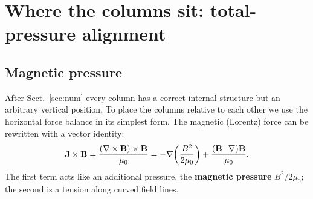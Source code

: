 \section{Where the columns sit: total-pressure alignment}\label{sec:align}
\subsection{Magnetic pressure}
After Sect.~\ref{sec:num} every column has a correct internal structure but an arbitrary vertical position. To place the
columns relative to each other we use the horizontal force balance in its simplest form. The magnetic (Lorentz) force can be
rewritten with a vector identity:
\begin{equation}
\mathbf J\times\mathbf B=\frac{(\nabla\times\mathbf B)\times\mathbf B}{\mu_0}
=-\nabla\!\left(\frac{B^2}{2\mu_0}\right)+\frac{(\mathbf B\cdot\nabla)\mathbf B}{\mu_0}.
\end{equation}
The first term acts like an additional pressure, the \textbf{magnetic pressure} $B^2/2\mu_0$; the second is a tension along
curved field lines.

